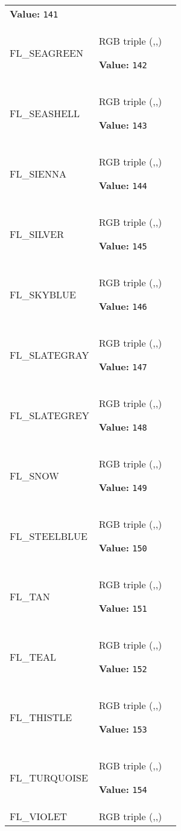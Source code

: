 \begin{longtable}{|p{\varnamewidth}|p{\vardescrwidth}|l}
\textbf{Value:} 
{\tt 141}&\\
\cline{1-2}
\raggedright F\-L\-\_\-S\-E\-A\-G\-R\-E\-E\-N\- & \raggedright RGB triple (,,)

\textbf{Value:} 
{\tt 142}&\\
\cline{1-2}
\raggedright F\-L\-\_\-S\-E\-A\-S\-H\-E\-L\-L\- & \raggedright RGB triple (,,)

\textbf{Value:} 
{\tt 143}&\\
\cline{1-2}
\raggedright F\-L\-\_\-S\-I\-E\-N\-N\-A\- & \raggedright RGB triple (,,)

\textbf{Value:} 
{\tt 144}&\\
\cline{1-2}
\raggedright F\-L\-\_\-S\-I\-L\-V\-E\-R\- & \raggedright RGB triple (,,)

\textbf{Value:} 
{\tt 145}&\\
\cline{1-2}
\raggedright F\-L\-\_\-S\-K\-Y\-B\-L\-U\-E\- & \raggedright RGB triple (,,)

\textbf{Value:} 
{\tt 146}&\\
\cline{1-2}
\raggedright F\-L\-\_\-S\-L\-A\-T\-E\-G\-R\-A\-Y\- & \raggedright RGB triple (,,)

\textbf{Value:} 
{\tt 147}&\\
\cline{1-2}
\raggedright F\-L\-\_\-S\-L\-A\-T\-E\-G\-R\-E\-Y\- & \raggedright RGB triple (,,)

\textbf{Value:} 
{\tt 148}&\\
\cline{1-2}
\raggedright F\-L\-\_\-S\-N\-O\-W\- & \raggedright RGB triple (,,)

\textbf{Value:} 
{\tt 149}&\\
\cline{1-2}
\raggedright F\-L\-\_\-S\-T\-E\-E\-L\-B\-L\-U\-E\- & \raggedright RGB triple (,,)

\textbf{Value:} 
{\tt 150}&\\
\cline{1-2}
\raggedright F\-L\-\_\-T\-A\-N\- & \raggedright RGB triple (,,)

\textbf{Value:} 
{\tt 151}&\\
\cline{1-2}
\raggedright F\-L\-\_\-T\-E\-A\-L\- & \raggedright RGB triple (,,)

\textbf{Value:} 
{\tt 152}&\\
\cline{1-2}
\raggedright F\-L\-\_\-T\-H\-I\-S\-T\-L\-E\- & \raggedright RGB triple (,,)

\textbf{Value:} 
{\tt 153}&\\
\cline{1-2}
\raggedright F\-L\-\_\-T\-U\-R\-Q\-U\-O\-I\-S\-E\- & \raggedright RGB triple (,,)

\textbf{Value:} 
{\tt 154}&\\
\cline{1-2}
\raggedright F\-L\-\_\-V\-I\-O\-L\-E\-T\- & \raggedright RGB triple (,,)


\end{longtable}
